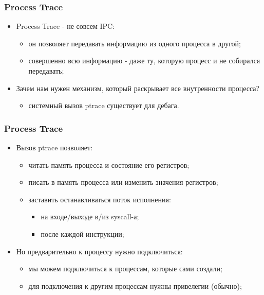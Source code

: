 \begin{frame}
\frametitle{Process Trace}

\begin{itemize}
  \item<1-> Process Trace - не совсем IPC:
    \begin{itemize}
      \item он позволяет передавать информацию из одного процесса в другой;
      \item<2-> совершенно всю информацию - даже ту, которую процесс и не собирался передавать;
    \end{itemize}
  \item<3-> Зачем нам нужен механизм, который раскрывает все внутренности процесса?
    \begin{itemize}
      \item<4-> системный вызов ptrace существует для дебага.
    \end{itemize}
\end{itemize}
\end{frame}

\begin{frame}
\frametitle{Process Trace}

\begin{itemize}
  \item Вызов ptrace позволяет:
    \begin{itemize}
      \item читать память процесса и состояние его регистров;
      \item писать в память процесса или изменить значения регистров;
      \item заставить останавливаться поток исполнения:
        \begin{itemize}
          \item на входе/выходе в/из syscall-а;
          \item после каждой инструкции;
        \end{itemize}
    \end{itemize}
  \item Но предварительно к процессу нужно подключиться:
    \begin{itemize}
      \item мы можем подключиться к процессам, которые сами создали;
      \item для подключения к другим процессам нужны привелегии (обычно);
    \end{itemize}
\end{itemize}
\end{frame}


